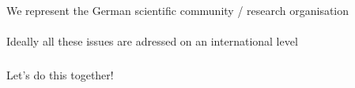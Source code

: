 \documentclass{beamer}
\begin{document}



\begin{frame}
  \frametitle{}
  \begin{block}{}
    \begin{center}
      We represent the German scientific community / research organisation\\
      \ \\
      \pause
      Ideally all these issues are adressed on an international level
    \end{center}
  \end{block}
\end{frame}

\begin{frame}
  \frametitle{}
  \begin{block}{}
    \begin{center}
      Let's do this together!
    \end{center}
  \end{block}
\end{frame}
\end{document}
